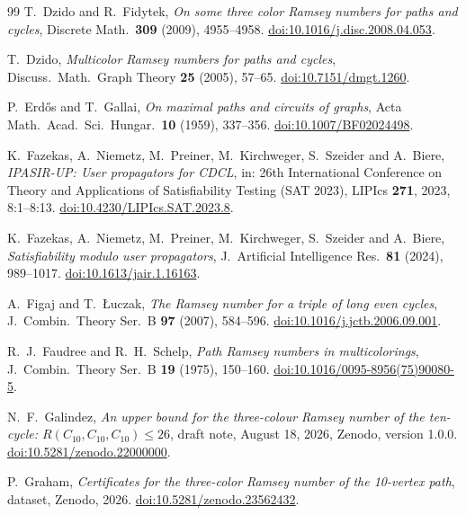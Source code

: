 \begin{thebibliography}{99}
T.~Dzido and R.~Fidytek, \emph{On some three color Ramsey numbers for paths
and cycles}, Discrete Math.\ \textbf{309} (2009), 4955--4958.
\href{https://doi.org/10.1016/j.disc.2008.04.053}{doi:10.1016/j.disc.2008.04.053}.

T.~Dzido, \emph{Multicolor Ramsey numbers for paths and cycles}, Discuss.\
Math.\ Graph Theory \textbf{25} (2005), 57--65.
\href{https://doi.org/10.7151/dmgt.1260}{doi:10.7151/dmgt.1260}.

P.~Erdős and T.~Gallai, \emph{On maximal paths and circuits of graphs},
Acta Math.\ Acad.\ Sci.\ Hungar.\ \textbf{10} (1959), 337--356.
\href{https://doi.org/10.1007/BF02024498}{doi:10.1007/BF02024498}.

K.~Fazekas, A.~Niemetz, M.~Preiner, M.~Kirchweger, S.~Szeider and
A.~Biere, \emph{IPASIR-UP: User propagators for CDCL}, in: 26th
International Conference on Theory and Applications of Satisfiability
Testing (SAT 2023), LIPIcs \textbf{271}, 2023, 8:1--8:13.
\href{https://doi.org/10.4230/LIPIcs.SAT.2023.8}{doi:10.4230/LIPIcs.SAT.2023.8}.

K.~Fazekas, A.~Niemetz, M.~Preiner, M.~Kirchweger, S.~Szeider and
A.~Biere, \emph{Satisfiability modulo user propagators}, J.~Artificial
Intelligence Res.\ \textbf{81} (2024), 989--1017.
\href{https://doi.org/10.1613/jair.1.16163}{doi:10.1613/jair.1.16163}.

A.~Figaj and T.~Łuczak, \emph{The Ramsey number for a triple of long even
cycles}, J.~Combin.\ Theory Ser.~B \textbf{97} (2007), 584--596.
\href{https://doi.org/10.1016/j.jctb.2006.09.001}{doi:10.1016/j.jctb.2006.09.001}.

R.~J.~Faudree and R.~H.~Schelp, \emph{Path Ramsey numbers in
multicolorings}, J.~Combin.\ Theory Ser.~B \textbf{19} (1975), 150--160.
\href{https://doi.org/10.1016/0095-8956(75)90080-5}{doi:10.1016/0095-8956(75)90080-5}.

N.~F.~Galindez, \emph{An upper bound for the three-colour Ramsey number of the ten-cycle: $R(C_{10},C_{10},C_{10})\le 26$}, draft note, August 18, 2026, Zenodo, version 1.0.0.
\href{https://doi.org/10.5281/zenodo.22000000}{doi:10.5281/zenodo.22000000}.

P.~Graham, \emph{Certificates for the three-color Ramsey number of the
10-vertex path}, dataset, Zenodo, 2026.
\href{https://doi.org/10.5281/zenodo.23562432}{doi:10.5281/zenodo.23562432}.


\end{thebibliography}
